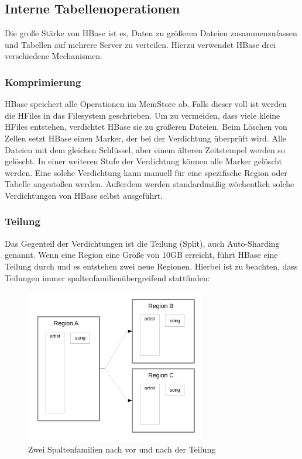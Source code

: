 \subsection{Interne Tabellenoperationen}
Die große Stärke von HBase ist es, Daten zu größeren Dateien zusammenzufassen und Tabellen auf mehrere Server zu verteilen. Hierzu verwendet HBase drei verschiedene Mechanismen.

\subsubsection{Komprimierung}\label{komprimierung}
HBase speichert alle Operationen im MemStore ab. Falls dieser voll ist werden die HFiles in das Filesystem geschrieben. Um zu vermeiden, dass viele kleine HFiles entstehen, verdichtet HBase sie zu größeren Dateien. Beim Löschen von Zellen setzt HBase einen Marker, der bei der Verdichtung überprüft wird. Alle Dateien mit dem gleichen Schlüssel, aber einem älteren Zeitstempel werden so gelöscht. In einer weiteren Stufe der Verdichtung können alle Marker gelöscht werden. Eine solche Verdichtung kann manuell für eine spezifische Region oder Tabelle angestoßen werden. Außerdem werden standardmäßig wöchentlich solche Verdichtungen von HBase selbst ausgeführt.

\subsubsection{Teilung}
Das Gegenteil der Verdichtungen ist die Teilung (Split), auch Auto-Sharding genannt. Wenn eine Region eine Größe von 10GB erreicht, führt HBase eine Teilung durch und es entstehen zwei neue Regionen. Hierbei ist zu beachten, dass Teilungen immer spaltenfamilienübergreifend stattfinden:

\begin{figure}[htbp] 
  \centering
     \includegraphics[width=0.7\textwidth]{images/split.pdf}
  \caption{Zwei Spaltenfamilien nach vor und nach der Teilung}
  \label{fig:Teilung}
\end{figure}


